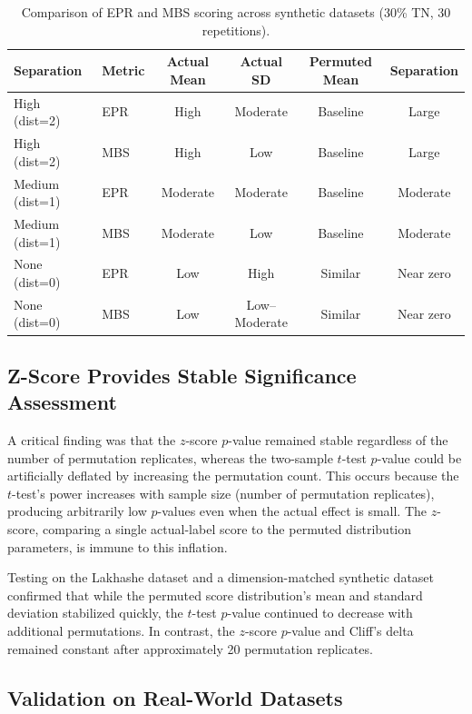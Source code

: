 \documentclass[12pt]{article}
\begin{document}
\begin{table}[ht]
\centering
\caption{Comparison of EPR and MBS scoring across synthetic datasets (30\% TN, 30 repetitions).}
\label{tab:scoring_comparison}
\begin{tabular}{llcccc}
\toprule
Separation & Metric & Actual Mean & Actual SD & Permuted Mean & Separation \\
\midrule
High (dist=2) & EPR & High & Moderate & Baseline & Large \\
High (dist=2) & MBS & High & Low & Baseline & Large \\
Medium (dist=1) & EPR & Moderate & Moderate & Baseline & Moderate \\
Medium (dist=1) & MBS & Moderate & Low & Baseline & Moderate \\
None (dist=0) & EPR & Low & High & Similar & Near zero \\
None (dist=0) & MBS & Low & Low--Moderate & Similar & Near zero \\
\bottomrule
\end{tabular}
\end{table}

\subsection{Z-Score Provides Stable Significance Assessment}

A critical finding was that the $z$-score $p$-value remained stable regardless of the number of permutation replicates, whereas the two-sample $t$-test $p$-value could be artificially deflated by increasing the permutation count. This occurs because the $t$-test's power increases with sample size (number of permutation replicates), producing arbitrarily low $p$-values even when the actual effect is small. The $z$-score, comparing a single actual-label score to the permuted distribution parameters, is immune to this inflation.

Testing on the Lakhashe dataset and a dimension-matched synthetic dataset confirmed that while the permuted score distribution's mean and standard deviation stabilized quickly, the $t$-test $p$-value continued to decrease with additional permutations. In contrast, the $z$-score $p$-value and Cliff's delta remained constant after approximately 20 permutation replicates.

\subsection{Validation on Real-World Datasets}
\end{document}

